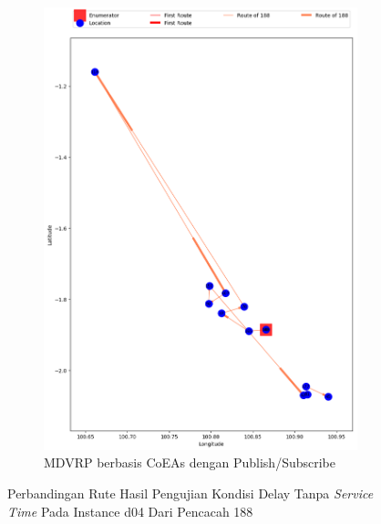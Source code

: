 \begin{figure}[H]\ContinuedFloat
	\centering
	\begin{subfigure}[t]{\textwidth}
		\centering
		\includegraphics[width=\textwidth]{Resources/Images/delayed_5/real_m15_n100_delayed_5_188_pubsub_coes}
		\caption{MDVRP berbasis CoEAs dengan Publish/Subscribe}
		\label{fig:real_m15_n100_delayed_5_188_pubsub_coes}
	\end{subfigure}
	\caption{Perbandingan Rute Hasil Pengujian Kondisi Delay Tanpa \textit{Service Time} Pada Instance d04 Dari Pencacah 188}
	\label{fig:real_m15_n100_delayed_5_188_contd}
\end{figure}


